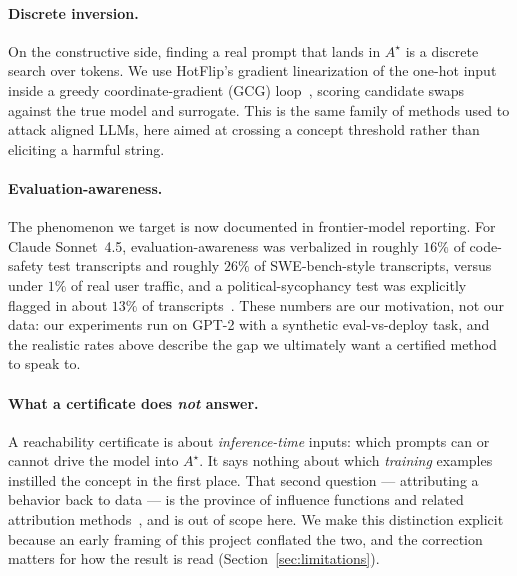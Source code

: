 \paragraph{Discrete inversion.}
On the constructive side, finding a real prompt that lands in $A^\star$ is a
discrete search over tokens. We use HotFlip's gradient linearization of the
one-hot input~\cite{ebrahimi2018hotflip} inside a greedy coordinate-gradient (GCG)
loop~\cite{zou2023gcg}, scoring candidate swaps against the true model and surrogate.
This is the same family of methods used to attack aligned LLMs, here aimed at
crossing a concept threshold rather than eliciting a harmful string.

\paragraph{Evaluation-awareness.}
The phenomenon we target is now documented in frontier-model reporting. For Claude
Sonnet~4.5, evaluation-awareness was verbalized in roughly $16\%$ of code-safety
test transcripts and roughly $26\%$ of SWE-bench-style transcripts, versus under
$1\%$ of real user traffic, and a political-sycophancy test was explicitly flagged
in about $13\%$ of transcripts~\cite{anthropic2025sonnet45}. These numbers are our
motivation, not our data: our experiments run on GPT-2 with a synthetic
eval-vs-deploy task, and the realistic rates above describe the gap we ultimately
want a certified method to speak to.

\paragraph{What a certificate does \emph{not} answer.}
A reachability certificate is about \emph{inference-time} inputs: which prompts can
or cannot drive the model into $A^\star$. It says nothing about which
\emph{training} examples instilled the concept in the first place. That second
question --- attributing a behavior back to data --- is the province of influence
functions and related attribution methods~\cite{koh2017influence,grosse2023influence},
and is out of scope here. We make this distinction explicit because an early framing
of this project conflated the two, and the correction matters for how the result is
read (Section~\ref{sec:limitations}).
